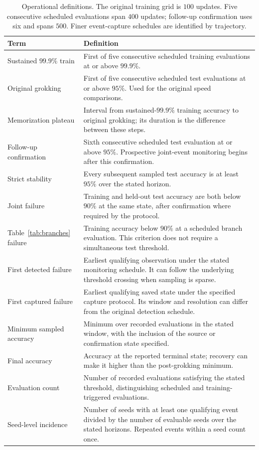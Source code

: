 \begin{table}[!htbp]
\centering\small
\caption{Operational definitions. The original training grid is $100$ updates. Five consecutive scheduled evaluations span $400$ updates; follow-up confirmation uses six and spans $500$. Finer event-capture schedules are identified by trajectory.}
\label{tab:definitions}
\begin{tabular}{p{}p{}}
\toprule
Term & Definition \\
\midrule
Sustained $99.9\%$ train & First of five consecutive scheduled training evaluations at or above $99.9\%$. \\
Original grokking & First of five consecutive scheduled test evaluations at or above $95\%$. Used for the original speed comparisons. \\
Memorization plateau & Interval from sustained-$99.9\%$ training accuracy to original grokking; its duration is the difference between these steps. \\
Follow-up confirmation & Sixth consecutive scheduled test evaluation at or above $95\%$. Prospective joint-event monitoring begins after this confirmation. \\
Strict stability & Every subsequent sampled test accuracy is at least $95\%$ over the stated horizon. \\
Joint failure & Training and held-out test accuracy are both below $90\%$ at the same state, after confirmation where required by the protocol. \\
Table~\ref{tab:branches} failure & Training accuracy below $90\%$ at a scheduled branch evaluation. This criterion does not require a simultaneous test threshold. \\
First detected failure & Earliest qualifying observation under the stated monitoring schedule. It can follow the underlying threshold crossing when sampling is sparse. \\
First captured failure & Earliest qualifying saved state under the specified capture protocol. Its window and resolution can differ from the original detection schedule. \\
Minimum sampled accuracy & Minimum over recorded evaluations in the stated window, with the inclusion of the source or confirmation state specified. \\
Final accuracy & Accuracy at the reported terminal state; recovery can make it higher than the post-grokking minimum. \\
Evaluation count & Number of recorded evaluations satisfying the stated threshold, distinguishing scheduled and training-triggered evaluations. \\
Seed-level incidence & Number of seeds with at least one qualifying event divided by the number of evaluable seeds over the stated horizons. Repeated events within a seed count once. \\
\bottomrule
\end{tabular}
\end{table}
